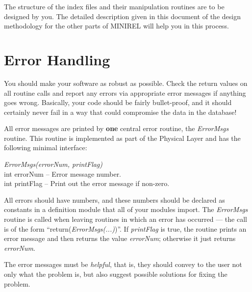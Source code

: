 The structure of the index files and their manipulation routines are to
be designed by you.  The detailed description given in this document of
the design methodology for the other parts of MINIREL will help you in
this process.


\section{Error Handling}
You should make your software as robust as possible.  Check the return
values on all routine calls and report any errors via appropriate error
messages if anything goes wrong.  Basically, your code should be fairly
bullet-proof, and it should certainly never fail in a way that could
compromise the data in the database!

All error messages are printed by {\bf one} central error routine, the
\emph{ErrorMsgs} routine.  This routine is implemented as part of the
Physical Layer and has the following minimal interface:

\medskip

\noindent
\hspace*{0.2in}\emph{ErrorMsgs(errorNum, printFlag)}
\\
\hspace*{0.2in}int errorNum -- Error message number.
\\
\hspace*{0.2in}int printFlag -- Print out the error message if non-zero.

\medskip

\noindent
All errors should have numbers, and these numbers should be
declared as constants in a definition module that all of your
modules import.  The \emph{ErrorMsgs} routine is
called when leaving routines in which an error has occurred --- the
call is of the form ``return(\emph{ErrorMsgs(...)})''.  If \emph{printFlag} 
is true, the routine prints an error message and
then returns the value \emph{errorNum};  otherwise it just
returns \emph{errorNum}.

The error messages must be \emph{helpful}, that is, they
should convey to the user not only what the problem is, but also
suggest possible solutions for fixing the problem.



